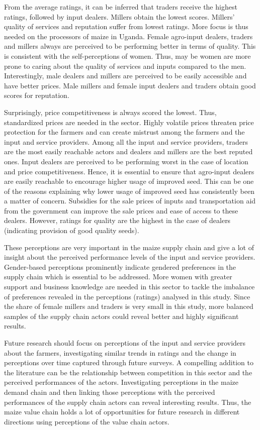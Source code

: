 \documentclass[12pt,english]{article}\usepackage[]{graphicx}\usepackage[]{color}
\begin{document}
From the average ratings, it can be inferred that traders receive
the highest ratings, followed by input dealers. Millers obtain the
lowest scores. Millers' quality of services and reputation suffer
from lowest ratings. More focus is thus needed on the processors of
maize in Uganda. Female agro-input dealers, traders and millers always
are perceived to be performing better in terms of quality. This is
consistent with the self-perceptions of women. Thus, may be women
are more prone to caring about the quality of services and inputs
compared to the men. Interestingly, male dealers and millers are perceived
to be easily accessible and have better prices. Male millers and female
input dealers and traders obtain good scores for reputation. 

Surprisingly, price competitiveness is always scored the lowest. Thus,
standardized prices are needed in the sector. Highly volatile prices
threaten price protection for the farmers and can create mistrust
among the farmers and the input and service providers. Among all the
input and service providers, traders are the most easily reachable
actors and dealers and millers are the best reputed ones. Input dealers
are perceived to be performing worst in the case of location and price
competitiveness. Hence, it is essential to ensure that agro-input
dealers are easily reachable to encourage higher usage of improved
seed. This can be one of the reasons explaining why lower usage of
improved seed has consistently been a matter of concern. Subsidies
for the sale prices of inputs and transportation aid from the government
can improve the sale prices and ease of access to these dealers. However,
ratings for quality are the highest in the case of dealers (indicating
provision of good quality seeds). 

These perceptions are very important in the maize supply chain and
give a lot of insight about the perceived performance levels of the
input and service providers. Gender-based perceptions prominently
indicate gendered preferences in the supply chain which is essential
to be addressed. More women with greater support and business knowledge
are needed in this sector to tackle the imbalance of preferences revealed
in the perceptions (ratings) analysed in this study. Since the share
of female millers and traders is very small in this study, more balanced
samples of the supply chain actors could reveal better and highly
significant results. 

Future research should focus on perceptions of the input and service
providers about the farmers, investigating similar trends in ratings
and the change in perceptions over time captured through future surveys.
A compelling addition to the literature can be the relationship between
competition in this sector and the perceived performances of the actors.
Investigating perceptions in the maize demand chain and then linking
those perceptions with the perceived performances of the supply chain
actors can reveal interesting results. Thus, the maize value chain
holds a lot of opportunities for future research in different directions
using perceptions of the value chain actors. 
\end{document}
